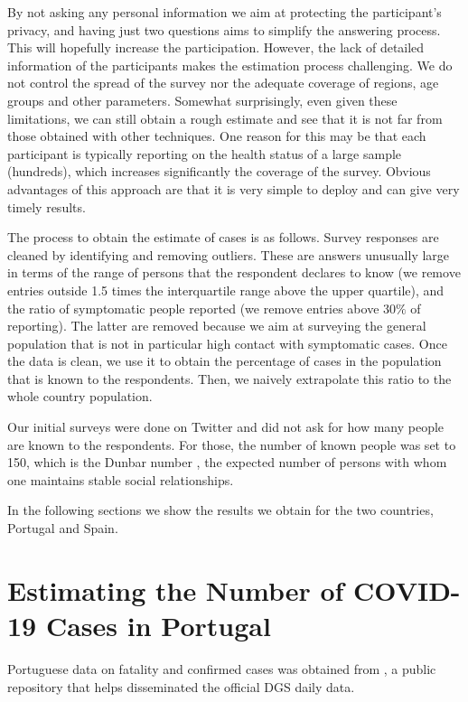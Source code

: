 \documentclass{article}
\begin{document}
By not asking any personal information we aim at protecting the participant's privacy, and having just two questions aims to simplify the answering process. This will hopefully increase the participation. However, the lack of detailed information of the participants makes the estimation process challenging. We do not control the spread of the survey nor the adequate coverage of regions, age groups and other parameters. Somewhat surprisingly, even given these limitations, we can still obtain a rough estimate and see that it is not far from those obtained with other techniques. One reason for this may be that each participant is typically reporting on the health status of a large sample (hundreds), which increases significantly the coverage of the survey. Obvious advantages of this approach are that it is very simple to deploy and can give very timely results.

The process to obtain the estimate of cases is as follows.
Survey responses are cleaned by identifying and removing outliers. These are answers unusually large in terms of the range of persons that the respondent declares to know (we remove entries outside 1.5 times the interquartile range above the upper quartile), and the ratio of symptomatic people reported (we remove entries above $30\%$ of reporting). The latter are removed because we aim at surveying the general population that is not in particular high contact with symptomatic cases. Once the data is clean, we use it to obtain the percentage of cases in the population that is known to the respondents. Then, we naively extrapolate this ratio to the whole country population.

Our initial surveys were done on Twitter and did not ask for how many people are known to the respondents. For those, the number of known people was set to 150, which is the Dunbar number \cite{Dunbar-wiki,dunbar2010many}, the expected number of persons with whom one maintains stable social relationships. 

In the following sections we show the results we obtain for the two countries, Portugal and Spain. 

\section{Estimating the Number of COVID-19 Cases in Portugal}

Portuguese data on fatality and confirmed cases was obtained from \cite{dssg-pt}, a public repository that helps disseminated the official DGS daily data.
\end{document}
